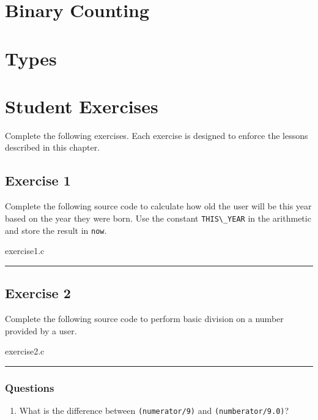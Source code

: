 \section{Binary Counting}

\section{Types}


\section{Student Exercises}

Complete the following exercises. Each exercise is designed to enforce the
lessons described in this chapter.


\subsection{Exercise 1}
Complete the following source code to calculate how old the user will be this
year based on the year they were born. Use the constant \verb|THIS\_YEAR| in
the arithmetic and store the result in \verb|now|.

\begin{code}{exercise1.c}

\end{code}
\footnotesize

\rule{\textwidth}{0.1pt}


\subsection{Exercise 2}
Complete the following source code to perform basic division on a number
provided by a user.

\begin{code}{exercise2.c}

\end{code}
\footnotesize

\rule{\textwidth}{0.1pt}

\subsubsection{Questions}

\begin{enumerate}
\item What is the difference between \verb|(numerator/9)| and
      \verb|(numberator/9.0)|?
\end{enumerate}
